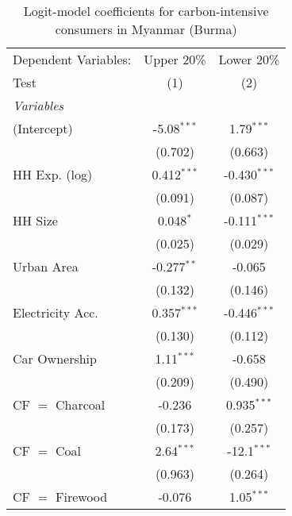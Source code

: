 
\begin{table}[htbp!]
   \centering
   \small
   \begin{adjustbox}{width = 1\textwidth, max height = 0.95\textheight, center}
      \begin{threeparttable}[b]
         \caption{\label{tab:Logit_1_MMR} Logit-model coefficients for carbon-intensive consumers in Myanmar (Burma)}
         \begin{tabular}{lcc}
            \tabularnewline \midrule \midrule
            Dependent Variables: & Upper 20\%    & Lower 20\%\\   
            Test                 & (1)           & (2)\\  
            \midrule
            \emph{Variables}\\
            (Intercept)          & -5.08$^{***}$ & 1.79$^{***}$\\   
                                 & (0.702)       & (0.663)\\   
            HH Exp. (log)        & 0.412$^{***}$ & -0.430$^{***}$\\   
                                 & (0.091)       & (0.087)\\   
            HH Size              & 0.048$^{*}$   & -0.111$^{***}$\\   
                                 & (0.025)       & (0.029)\\   
            Urban Area           & -0.277$^{**}$ & -0.065\\   
                                 & (0.132)       & (0.146)\\   
            Electricity Acc.     & 0.357$^{***}$ & -0.446$^{***}$\\   
                                 & (0.130)       & (0.112)\\   
            Car Ownership        & 1.11$^{***}$  & -0.658\\   
                                 & (0.209)       & (0.490)\\   
            CF $=$ Charcoal      & -0.236        & 0.935$^{***}$\\   
                                 & (0.173)       & (0.257)\\   
            CF $=$ Coal          & 2.64$^{***}$  & -12.1$^{***}$\\   
                                 & (0.963)       & (0.264)\\   
            CF $=$ Firewood      & -0.076        & 1.05$^{***}$\\   

\end{tabular}
\end{threeparttable}
\end{adjustbox}
\end{table}
